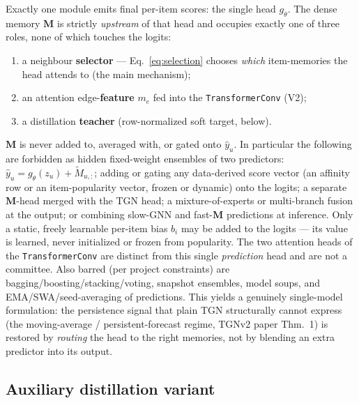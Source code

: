 \documentclass[11pt]{article}
\begin{document}
Exactly one module emits final per-item scores: the single head $g_\theta$. The dense memory $\mathbf{M}$ is strictly \emph{upstream} of that head and occupies exactly one of three roles, none of which touches the logits:
\begin{enumerate}
\item[(1)] a neighbour \textbf{selector} --- Eq.~\eqref{eq:selection} chooses \emph{which} item-memories the head attends to (the main mechanism);
\item[(2)] an attention edge-\textbf{feature} $m_e$ fed into the \texttt{TransformerConv} (V2);
\item[(3)] a distillation \textbf{teacher} (row-normalized soft target, below).
\end{enumerate}
$\mathbf{M}$ is never added to, averaged with, or gated onto $\hat y_u$. In particular the following are forbidden as hidden fixed-weight ensembles of two predictors: $\hat y_u = g_\theta(z_u) + \tilde M_{u,:}$; adding or gating any data-derived score vector (an affinity row or an item-popularity vector, frozen or dynamic) onto the logits; a separate $\mathbf{M}$-head merged with the TGN head; a mixture-of-experts or multi-branch fusion at the output; or combining slow-GNN and fast-$\mathbf{M}$ predictions at inference. Only a static, freely learnable per-item bias $b_i$ may be added to the logits --- its value is learned, never initialized or frozen from popularity. The two attention heads of the \texttt{TransformerConv} are distinct from this single \emph{prediction} head and are not a committee. Also barred (per project constraints) are bagging/boosting/stacking/voting, snapshot ensembles, model soups, and EMA/SWA/seed-averaging of predictions. This yields a genuinely single-model formulation: the persistence signal that plain TGN structurally cannot express (the moving-average / persistent-forecast regime, TGNv2 paper Thm.~1) is restored by \emph{routing} the head to the right memories, not by blending an extra predictor into its output.

\subsection{Auxiliary distillation variant}
\end{document}
